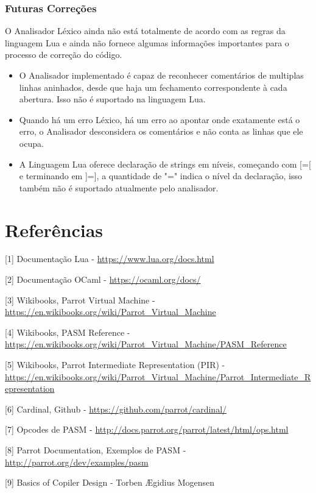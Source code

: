 \documentclass[12pt,a4paper,twoside]{report}
\begin{document}
\subsection{Futuras Correções}

O Analisador Léxico ainda não está totalmente de acordo com as regras da linguagem Lua e ainda não fornece algumas informações importantes para o processo de correção do código.

\begin{itemize}
\item O Analisador implementado é capaz de reconhecer comentários de multiplas linhas aninhados, desde que haja um fechamento correspondente à cada abertura. Isso não é suportado na linguagem Lua.
\item Quando há um erro Léxico, há um erro ao apontar onde exatamente está o erro, o Analisador desconsidera os comentários e não conta as linhas que ele ocupa.
\item A Linguagem Lua oferece declaração de strings em níveis, começando com [=[ e terminando em ]=], a quantidade de "=" indica o nível da declaração, isso também não é suportado atualmente pelo analisador.
\end{itemize}


\chapter{Referências}
[1] Documentação Lua - \url{https://www.lua.org/docs.html}

[2] Documentação OCaml - \url{https://ocaml.org/docs/}

[3] Wikibooks, Parrot Virtual Machine - \url{https://en.wikibooks.org/wiki/Parrot_Virtual_Machine}

[4] Wikibooks, PASM Reference - \url{https://en.wikibooks.org/wiki/Parrot_Virtual_Machine/PASM_Reference}

[5] Wikibooks, Parrot Intermediate Representation (PIR) - \url{https://en.wikibooks.org/wiki/Parrot_Virtual_Machine/Parrot_Intermediate_Representation}

[6] Cardinal, Github - \url{https://github.com/parrot/cardinal/}

[7] Opcodes de PASM - \url{http://docs.parrot.org/parrot/latest/html/ops.html}

[8] Parrot Documentation, Exemplos de PASM - \url{http://parrot.org/dev/examples/pasm}

[9] Basics of Copiler Design - Torben Ægidius Mogensen

\clearpage
{}
\appendix
\end{document}
